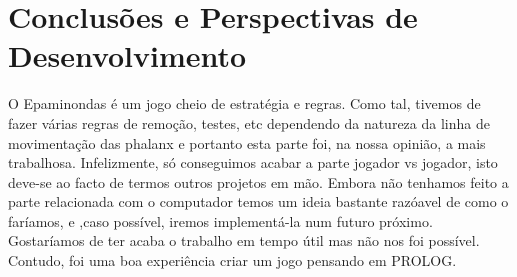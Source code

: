 \documentclass[a4paper]{article}
\begin{document}
\clearpage
\section{Conclusões e Perspectivas de Desenvolvimento}
O Epaminondas é um jogo cheio de estratégia e regras. Como tal, tivemos de fazer várias regras de remoção, testes, etc dependendo da natureza da linha de movimentação das phalanx e portanto esta parte foi, na nossa opinião, a mais trabalhosa. Infelizmente, só conseguimos acabar a parte jogador vs jogador, isto deve-se ao facto de termos outros projetos em mão. Embora não tenhamos feito a parte relacionada com o computador temos um ideia bastante razóavel de como o faríamos, e ,caso possível, iremos implementá-la num futuro próximo.
\\\linebreak
Gostaríamos de ter acaba o trabalho em tempo útil mas não nos foi possível. Contudo, foi uma boa experiência criar um jogo pensando em PROLOG.
\\\linebreak

\clearpage
{}
\renewcommand\refname{Bibliografia}


\end{document}

